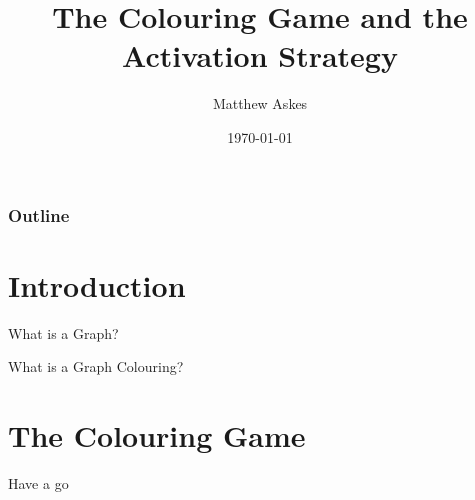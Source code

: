 \documentclass{beamer}
\title[The Colouring Game and the Activ. Strat.]{The Colouring Game and the Activation Strategy}
\author{Matthew Askes}
\institute[Victoria University]{Victoria University of Wellington}
\date{\today}
\begin{document}
\frame{\titlepage}


\begin{frame}
    \frametitle{Outline}
    \tableofcontents
\end{frame}

\section{Introduction}


\begin{frame}{\secname}{What is a Graph?}
    
\end{frame}


\begin{frame}{\secname}{What is a Graph Colouring?}
\end{frame}


\section{The Colouring Game}


\begin{frame}{\secname} 
        
        
    
\end{frame}


\begin{frame}{\secname}{Have a go}
    
    
\end{frame}
\end{document}
